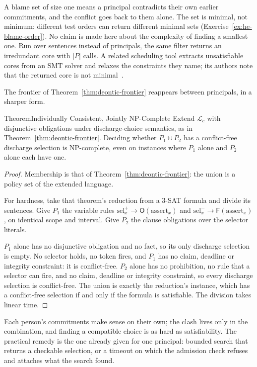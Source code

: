 A blame set of size one means a principal contradicts their own earlier
commitments, and the conflict goes back to them alone. The set is minimal, not
minimum: different test orders can return different minimal sets
(Exercise~\ref{ex:he-blame-order}). No claim is made here about the complexity
of finding a smallest one. Run over sentences instead of principals, the same
filter returns an irredundant core with $|P|$ calls. A related scheduling tool
extracts unsatisfiable cores from an SMT solver and relaxes the constraints
they name; its authors note that the returned core is not
minimal~.

The frontier of Theorem~\ref{thm:deontic-frontier} reappears between
principals, in a sharper form.

\begin{pdclaim}{Theorem}{Individually Consistent, Jointly NP-Complete}
\setlength{\parskip}{4pt plus 1pt}
\label{thm:he-joint-frontier}
Extend $\mathcal{L}_c$ with disjunctive obligations under discharge-choice
semantics, as in Theorem~\ref{thm:deontic-frontier}. Deciding whether
$P_1\uplus P_2$ has a conflict-free discharge selection is NP-complete, even
on instances where $P_1$ alone and $P_2$ alone each have one.
\end{pdclaim}
\begin{proof}
\setlength{\parskip}{4pt plus 1pt}
Membership is that of Theorem~\ref{thm:deontic-frontier}: the union is a policy
set of the extended language.

For hardness, take that theorem's reduction from a 3-SAT formula and
divide its sentences. Give $P_1$ the variable rules
$\mathrm{sel}^{+}_x\to\mathsf{O}(\mathrm{assert}_x)$ and
$\mathrm{sel}^{-}_x\to\mathsf{F}(\mathrm{assert}_x)$, on identical scope and
interval. Give $P_2$ the clause obligations over the selector literals.

$P_1$ alone has no disjunctive obligation and no fact, so its only discharge
selection is empty. No selector holds, no token fires, and $P_1$ has no claim,
deadline or integrity constraint: it is conflict-free. $P_2$ alone has no
prohibition, no rule that a selector can fire, and no claim, deadline or
integrity constraint, so every discharge selection is conflict-free. The union is exactly the reduction's instance, which has a
conflict-free selection if and only if the formula is satisfiable. The division
takes linear time.
\end{proof}

Each person's commitments make sense on their own; the clash lives only in the
combination, and finding a compatible choice is as hard as satisfiability.
The practical remedy is the one already given for one principal: bounded
search that returns a checkable selection, or a timeout on which the admission
check refuses and attaches what the search found.

